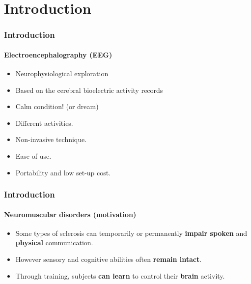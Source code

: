 \section{Introduction}
\frame
{
\frametitle{Introduction}
\framesubtitle{Electroencephalography (EEG)}
\begin{itemize}
	\item Neurophysiological exploration
	\item Based on the cerebral bioelectric activity records
	\item Calm condition! (or dream)
	\item Different activities.
	\item Non-invasive technique.
	\item Ease of use.
	\item Portability and low set-up cost.
\end{itemize}
}

\frame
{
\frametitle{Introduction}
\framesubtitle{Neuromuscular disorders (motivation)}
\begin{itemize}
	\item Some types of sclerosis can temporarily or permanently \textbf{impair spoken} and \textbf{physical} communication.
	\item However sensory and cognitive abilities often \textbf{remain intact}.
	\item Through training, subjects \textbf{can learn} to control their \textbf{brain} activity.
\end{itemize}

}
